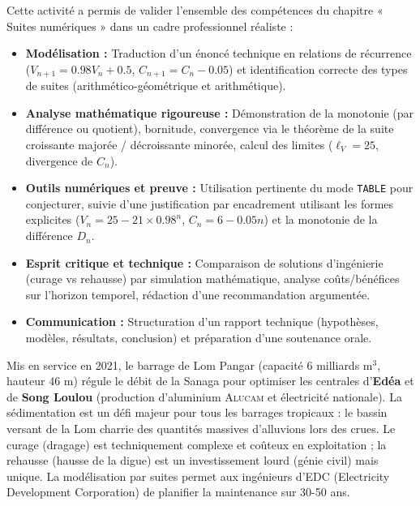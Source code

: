 \documentclass[11pt]{article}
\newcommand{\cle}[1]{{\popxbold\color{popdark}#1}}
\newcounter{popsec}
\newcounter{popsub}
\newcommand{\courssub}[1]{%
  \stepcounter{popsub}%
  \par\vspace{9pt}\noindent{\popxbold\fontsize{11.5}{13}\selectfont\color{popink}{\color{poporange}\thepopsec.\thepopsub}\hspace{6pt}#1}\par\nopagebreak\vspace{4pt}
}
\begin{document}
\courssub{Bilan et compétences validées}
Cette activité a permis de \cle{valider l'ensemble des compétences} du chapitre « Suites numériques » dans un cadre professionnel réaliste :
\begin{itemize}
    \item \textbf{Modélisation :} Traduction d'un énoncé technique en relations de récurrence ($V_{n+1}=\num{0,98}V_n+\num{0,5}$, $C_{n+1}=C_n-\num{0,05}$) et identification correcte des types de suites (arithmético-géométrique et arithmétique).
    \item \textbf{Analyse mathématique rigoureuse :} Démonstration de la monotonie (par différence ou quotient), bornitude, convergence via le théorème de la suite croissante majorée / décroissante minorée, calcul des limites ($\ell_V=\num{25}$, divergence de $C_n$).
    \item \textbf{Outils numériques et preuve :} Utilisation pertinente du mode \texttt{TABLE} pour conjecturer, suivie d'une justification par \cle{encadrement} utilisant les formes explicites ($V_n = \num{25} - \num{21} \times \num{0,98}^n$, $C_n = \num{6} - \num{0,05}n$) et la monotonie de la différence $D_n$.
    \item \textbf{Esprit critique et technique :} Comparaison de solutions d'ingénierie (curage vs rehausse) par simulation mathématique, analyse coûts/bénéfices sur l'horizon temporel, rédaction d'une recommandation argumentée.
    \item \textbf{Communication :} Structuration d'un rapport technique (hypothèses, modèles, résultats, conclusion) et préparation d'une soutenance orale.
\end{itemize}

\begin{savaistu}
Mis en service en 2021, le barrage de Lom Pangar (capacité $\num{6}$ milliards $\si{\meter\cubed}$, hauteur $\num{46}$ m) régule le débit de la Sanaga pour optimiser les centrales d'\textbf{Edéa} et de \textbf{Song Loulou} (production d'aluminium \textsc{Alucam} et électricité nationale). La sédimentation est un défi majeur pour tous les barrages tropicaux : le bassin versant de la Lom charrie des quantités massives d'alluvions lors des crues. Le curage (dragage) est techniquement complexe et coûteux en exploitation ; la rehausse (hausse de la digue) est un investissement lourd (génie civil) mais unique. La modélisation par suites permet aux ingénieurs d'EDC (Electricity Development Corporation) de planifier la maintenance sur 30-50 ans.
\end{savaistu}
\end{document}
